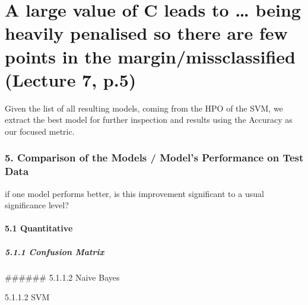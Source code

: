 \documentclass[
]{article}
\newenvironment{Shaded}{\begin{snugshade}}{\end{snugshade}}
\newcommand{\AttributeTok}[1]{\textcolor[rgb]{0.77,0.63,0.00}{#1}}
\newcommand{\ConstantTok}[1]{\textcolor[rgb]{0.00,0.00,0.00}{#1}}
\newcommand{\FunctionTok}[1]{\textcolor[rgb]{0.00,0.00,0.00}{#1}}
\newcommand{\NormalTok}[1]{#1}
\newcommand{\OtherTok}[1]{\textcolor[rgb]{0.56,0.35,0.01}{#1}}
\newcommand{\SpecialCharTok}[1]{\textcolor[rgb]{0.00,0.00,0.00}{#1}}
\newcommand{\StringTok}[1]{\textcolor[rgb]{0.31,0.60,0.02}{#1}}
\begin{document}
\hypertarget{a-large-value-of-c-leads-to-being-heavily-penalised-so-there-are-few-points-in-the-marginmissclassified-lecture-7-p.5}{%
\section{A large value of C leads to \ldots{} being heavily penalised so
there are few points in the margin/missclassified (Lecture 7,
p.5)}\label{a-large-value-of-c-leads-to-being-heavily-penalised-so-there-are-few-points-in-the-marginmissclassified-lecture-7-p.5}}

Given the list of all resulting models, coming from the HPO of the SVM,
we extract the best model for further inspection and results using the
Accuracy as our focused metric.

\hypertarget{comparison-of-the-models-models-performance-on-test-data}{%
\subsubsection{5. Comparison of the Models / Model's Performance on Test
Data}\label{comparison-of-the-models-models-performance-on-test-data}}

\hfill\break
if one model performs better, is this improvement significant to a usual
significance level?

\hypertarget{quantitative}{%
\paragraph{5.1 Quantitative}\label{quantitative}}

\hypertarget{confusion-matrix}{%
\subparagraph{5.1.1 Confusion Matrix}\label{confusion-matrix}}

\hfill\break
\#\#\#\#\#\# 5.1.1.2 Naive Bayes

5.1.1.2 SVM

\begin{Shaded}
\end{Shaded}
\end{document}
